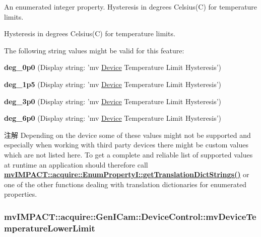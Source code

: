 An enumerated integer property. Hysteresis in degrees Celsius(\+C) for temperature limits. 

Hysteresis in degrees Celsius(\+C) for temperature limits.

The following string values might be valid for this feature\+:
\begin{DoxyItemize}
\item {\bfseries deg\+\_\+0p0} (Display string\+: 'mv \hyperlink{classmv_i_m_p_a_c_t_1_1acquire_1_1_device}{Device} Temperature Limit Hysteresis')
\item {\bfseries deg\+\_\+1p5} (Display string\+: 'mv \hyperlink{classmv_i_m_p_a_c_t_1_1acquire_1_1_device}{Device} Temperature Limit Hysteresis')
\item {\bfseries deg\+\_\+3p0} (Display string\+: 'mv \hyperlink{classmv_i_m_p_a_c_t_1_1acquire_1_1_device}{Device} Temperature Limit Hysteresis')
\item {\bfseries deg\+\_\+6p0} (Display string\+: 'mv \hyperlink{classmv_i_m_p_a_c_t_1_1acquire_1_1_device}{Device} Temperature Limit Hysteresis')
\end{DoxyItemize}

\begin{DoxyNote}{注解}
Depending on the device some of these values might not be supported and especially when working with third party devices there might be custom values which are not listed here. To get a complete and reliable list of supported values at runtime an application should therefore call {\bfseries \hyperlink{classmv_i_m_p_a_c_t_1_1acquire_1_1_enum_property_i_a0ba6ccbf5ee69784d5d0b537924d26b6}{mv\+I\+M\+P\+A\+C\+T\+::acquire\+::\+Enum\+Property\+I\+::get\+Translation\+Dict\+Strings()}} or one of the other functions dealing with translation dictionaries for enumerated properties. 
\end{DoxyNote}
\hypertarget{classmv_i_m_p_a_c_t_1_1acquire_1_1_gen_i_cam_1_1_device_control_a0958db7ce440469a6c46cbe67e43e539}{
\subsubsection[{mv\+Device\+Temperature\+Lower\+Limit}]{ mv\+I\+M\+P\+A\+C\+T\+::acquire\+::\+Gen\+I\+Cam\+::\+Device\+Control\+::mv\+Device\+Temperature\+Lower\+Limit}}\label{classmv_i_m_p_a_c_t_1_1acquire_1_1_gen_i_cam_1_1_device_control_a0958db7ce440469a6c46cbe67e43e539}


